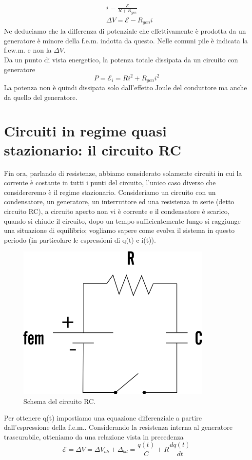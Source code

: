 \documentclass[
10pt, %
a4paper, %
oneside, %
headinclude,footinclude, %
BCOR5mm, %
]{scrartcl}
\begin{document}
\begin{align*}
	&i = \frac{\mathcal{E}}{R+R_{gen}}\\
	&\Delta V = \mathcal{E}-R_{gen}i
\end{align*}
Ne deduciamo che la differenza di potenziale che effettivamente è prodotta da un generatore è minore della f.e.m. indotta da questo. Nelle comuni pile è indicata la f.ew.m. e non la $\Delta V$.\\
Da un punto di vista energetico, la potenza totale dissipata da un circuito con generatore
\[P = \mathcal{E}_i = R i^2 + R_{gen}i^2\]
La potenza non è quindi dissipata solo dall'effetto Joule del conduttore ma anche da quello del generatore. 
\section{Circuiti in regime quasi stazionario: il circuito RC}
Fin ora, parlando di resistenze, abbiamo considerato solamente circuiti in cui la corrente è costante in tutti i punti del circuito, l'unico caso diverso che considereremo è il regime stazionario. Consideriamo un circuito con un condensatore, un generatore, un interruttore ed una resistenza in serie (detto circuito RC), a circuito aperto non vi è corrente e il condensatore è scarico, quando si chiude il circuito, dopo un tempo sufficientemente lungo si raggiunge una situazione di equilibrio; vogliamo sapere come evolva il sistema in questo periodo (in particolare le espressioni di q(t) e i(t)). 
\begin{figure}[h!]
	\centering
	\includegraphics[width=0.5\linewidth]{images/circuito-rc}
	\caption{Schema del circuito RC.}
	\label{fig:circuito-rc}
\end{figure}
\FloatBarrier
Per ottenere q(t) impostiamo una equazione differenziale a partire dall'espressione della f.e.m.. Considerando la resistenza interna al generatore trascurabile, otteniamo da una relazione vista in precedenza 
\[\mathcal{E} = \Delta V = \Delta V_{ab} + \Delta_{bd} = \frac{q(t)}{C}+R\frac{dq(t)}{dt}\]
\end{document}
